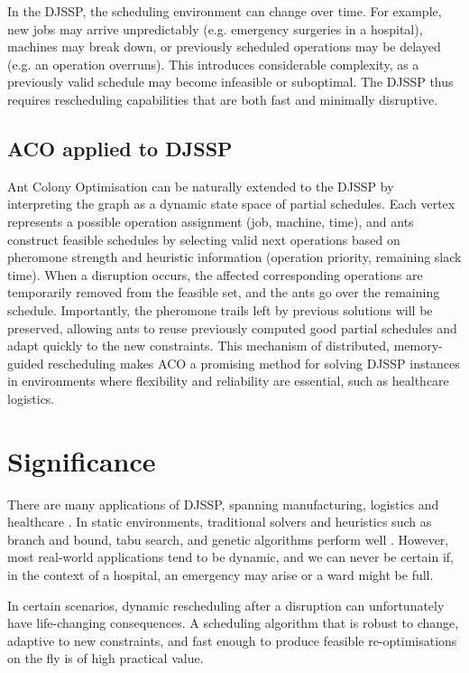 \documentclass[project-plan]{report-template}
\begin{document}
In the DJSSP, the scheduling environment can change over time. For example, new jobs may arrive unpredictably (e.g. emergency surgeries in a hospital), machines may break down, or previously scheduled operations may be delayed (e.g. an operation overruns). This introduces considerable complexity, as a previously valid schedule may become infeasible or suboptimal. The DJSSP thus requires rescheduling capabilities that are both fast and minimally disruptive.

\subsection{ACO applied to DJSSP}

Ant Colony Optimisation can be naturally extended to the DJSSP by interpreting the graph as a dynamic state space of partial schedules. Each vertex represents a possible operation assignment (job, machine, time), and ants construct feasible schedules by selecting valid next operations based on pheromone strength and heuristic information (operation priority, remaining slack time). When a disruption occurs, the affected corresponding operations are temporarily removed from the feasible set, and the ants go over the remaining schedule. Importantly, the pheromone trails left by previous solutions will be preserved, allowing ants to reuse previously computed good partial schedules and adapt quickly to the new constraints. This mechanism of distributed, memory-guided rescheduling makes ACO a promising method for solving DJSSP instances in environments where flexibility and reliability are essential, such as healthcare logistics.

\section{Significance}
There are many applications of DJSSP, spanning manufacturing, logistics \cite{jssp-manufacturing} and healthcare \cite{jssp-healthcare}. In static environments, traditional solvers and heuristics such as branch and bound, tabu search, and genetic algorithms perform well \cite{Wouda_Lan_Kool_PyVRP_2024}. However, most real-world applications tend to be dynamic, and we can never be certain if, in the context of a hospital, an emergency may arise or a ward might be full.

In certain scenarios, dynamic rescheduling after a disruption can unfortunately have life-changing consequences. A scheduling algorithm that is robust to change, adaptive to new constraints, and fast enough to produce feasible re-optimisations on the fly is of high practical value.
\end{document}
